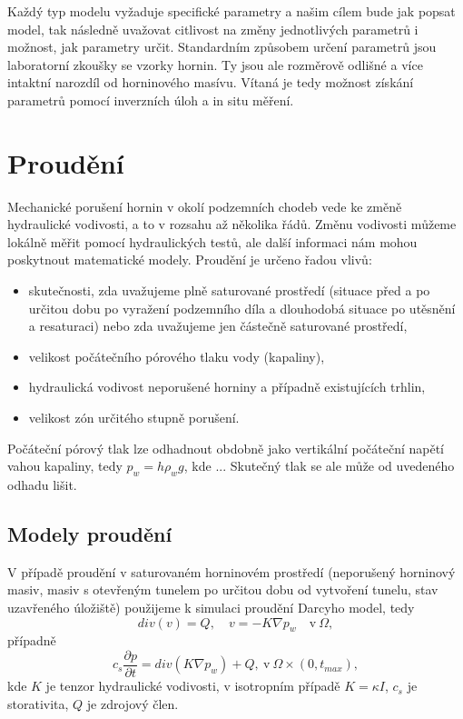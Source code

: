 \documentclass[a4paper]{article}
\newcommand{\alert}[1]{{\color{red}#1}}
\begin{document}
Každý typ modelu vyžaduje specifické parametry a našim cílem bude jak popsat model, tak následně uvažovat citlivost na změny jednotlivých parametrů i možnost, jak parametry určit. Standardním způsobem určení parametrů jsou laboratorní zkoušky \alert{se vzorky hornin. Ty jsou ale rozměrově odlišné a více intaktní narozdíl od horninového masívu.} Vítaná je tedy možnost získání parametrů pomocí inverzních úloh a in situ měření.



\section{Proudění}

Mechanické porušení hornin v okolí podzemních chodeb vede ke změně
hydraulické vodivosti, a to v rozsahu až několika řádů. Změnu vodivosti
můžeme lokálně měřit pomocí hydraulických testů, ale další informaci nám
mohou poskytnout matematické modely. Proudění je určeno řadou vlivů:
\begin{itemize}
	\item skutečnosti, zda uvažujeme plně saturované prostředí (situace před a po určitou dobu po vyražení podzemního díla a dlouhodobá situace po utěsnění a resaturaci) nebo zda uvažujeme jen částečně saturované prostředí,
	\item velikost počátečního pórového tlaku vody (kapaliny),
	\item hydraulická vodivost neporušené horniny a případně existujících trhlin,
	\item velikost zón určitého stupně porušení.
\end{itemize}
Počáteční pórový tlak lze odhadnout obdobně jako vertikální počáteční napětí
vahou kapaliny, tedy $p_w = h\rho_w g$, kde ... Skutečný tlak se ale může od uvedeného odhadu lišit.

\subsection{Modely proudění}
V případě proudění v saturovaném horninovém prostředí (neporušený horninový masiv, masiv s otevřeným tunelem po určitou dobu od vytvoření tunelu, stav uzavřeného úložiště) použijeme k simulaci proudění Darcyho model, tedy
\begin{equation}\label{eq2}
	div(v) = Q, \quad  v = - K\nabla p_w \quad \mbox{v} \ \Omega,
\end{equation}
případně
\begin{equation}\label{eq3}
	c_s \frac{\partial p}{\partial t} = div (K\nabla p_w) + Q, \  \mbox{v} \ \Omega \times (0, t_{max}),
\end{equation}
kde $K$ je tenzor hydraulické vodivosti, v isotropním případě $K = \kappa I$, $c_s$ je
storativita, $Q$ je zdrojový člen.
\end{document}

